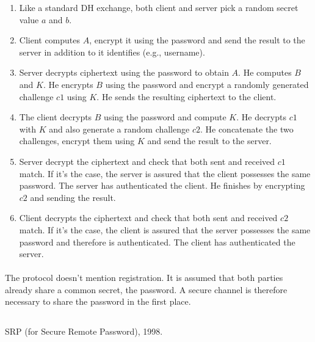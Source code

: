 \documentclass[../report.tex]{subfiles}
\begin{document}
\begin{enumerate}
 \item Like a standard DH exchange, both client and server pick a random secret value $a$ and $b$.
 \item Client computes $A$, encrypt it using the password and send the result to the server in addition to it identifies (e.g., username).
 \item Server decrypts ciphertext using the password to obtain $A$. He computes $B$ and $K$. He encrypts $B$ using the password and encrypt a randomly generated challenge $c1$ using $K$. He sends the resulting ciphertext to the client.
 \item The client decrypts $B$ using the password and compute $K$. He decrypts $c1$ with $K$ and also generate a random challenge $c2$. He concatenate the two challenges, encrypt them using $K$ and send the result to the server.
 \item Server decrypt the ciphertext and check that both sent and received $c1$ match. If it's the case, the server is assured that the client possesses the same password. The server has authenticated the client. He finishes by encrypting $c2$ and sending the result.
 \item Client decrypts the ciphertext and check that both sent and received $c2$ match. If it's the case, the client is assured that the server possesses the same password and therefore is authenticated. The client has authenticated the server.
\end{enumerate}



\paragraph{}
The protocol doesn't mention registration. It is assumed that both parties already share a common secret, the password. A secure channel is therefore necessary to share the password in the first place.





\subsection{}
SRP (for Secure Remote Password), 1998.

\end{document}
